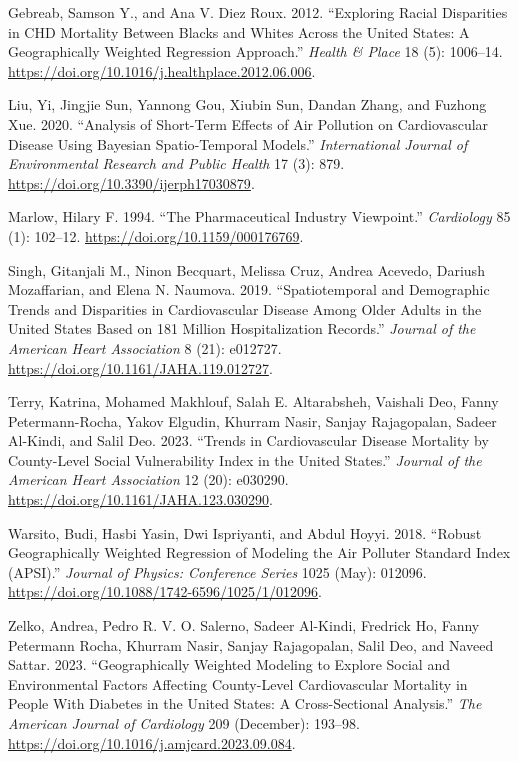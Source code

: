 \documentclass[
]{article}
\newlength{\cslhangindent}
\newenvironment{CSLReferences}[2] %
 {\begin{list}{}{%
  \setlength{\itemindent}{0pt}
  \setlength{\leftmargin}{0pt}
  \setlength{\parsep}{0pt}
  \ifodd #1
   \setlength{\leftmargin}{\cslhangindent}
   \setlength{\itemindent}{-1\cslhangindent}
  \fi
  \setlength{\itemsep}{#2\baselineskip}}}
 {\end{list}}
\begin{document}
\label{refs}
\begin{CSLReferences}{1}{0}
Gebreab, Samson Y., and Ana V. Diez Roux. 2012. {``Exploring Racial
Disparities in {CHD} Mortality Between Blacks and Whites Across the
{United} {States}: {A} Geographically Weighted Regression Approach.''}
\emph{Health \& Place} 18 (5): 1006--14.
\url{https://doi.org/10.1016/j.healthplace.2012.06.006}.

Liu, Yi, Jingjie Sun, Yannong Gou, Xiubin Sun, Dandan Zhang, and Fuzhong
Xue. 2020. {``Analysis of {Short}-{Term} {Effects} of {Air} {Pollution}
on {Cardiovascular} {Disease} {Using} {Bayesian} {Spatio}-{Temporal}
{Models}.''} \emph{International Journal of Environmental Research and
Public Health} 17 (3): 879.
\url{https://doi.org/10.3390/ijerph17030879}.

Marlow, Hilary F. 1994. {``The Pharmaceutical Industry Viewpoint.''}
\emph{Cardiology} 85 (1): 102--12.
\url{https://doi.org/10.1159/000176769}.

Singh, Gitanjali M., Ninon Becquart, Melissa Cruz, Andrea Acevedo,
Dariush Mozaffarian, and Elena N. Naumova. 2019. {``Spatiotemporal and
{Demographic} {Trends} and {Disparities} in {Cardiovascular} {Disease}
{Among} {Older} {Adults} in the {United} {States} {Based} on 181
{Million} {Hospitalization} {Records}.''} \emph{Journal of the American
Heart Association} 8 (21): e012727.
\url{https://doi.org/10.1161/JAHA.119.012727}.

Terry, Katrina, Mohamed Makhlouf, Salah E. Altarabsheh, Vaishali Deo,
Fanny Petermann-Rocha, Yakov Elgudin, Khurram Nasir, Sanjay Rajagopalan,
Sadeer Al-Kindi, and Salil Deo. 2023. {``Trends in {Cardiovascular}
{Disease} {Mortality} by {County}-{Level} {Social} {Vulnerability}
{Index} in the {United} {States}.''} \emph{Journal of the American Heart
Association} 12 (20): e030290.
\url{https://doi.org/10.1161/JAHA.123.030290}.

Warsito, Budi, Hasbi Yasin, Dwi Ispriyanti, and Abdul Hoyyi. 2018.
{``Robust Geographically Weighted Regression of Modeling the {Air}
{Polluter} {Standard} {Index} ({APSI}).''} \emph{Journal of Physics:
Conference Series} 1025 (May): 012096.
\url{https://doi.org/10.1088/1742-6596/1025/1/012096}.

Zelko, Andrea, Pedro R. V. O. Salerno, Sadeer Al-Kindi, Fredrick Ho,
Fanny Petermann Rocha, Khurram Nasir, Sanjay Rajagopalan, Salil Deo, and
Naveed Sattar. 2023. {``Geographically {Weighted} {Modeling} to
{Explore} {Social} and {Environmental} {Factors} {Affecting}
{County}-{Level} {Cardiovascular} {Mortality} in {People} {With}
{Diabetes} in the {United} {States}: {A} {Cross}-{Sectional}
{Analysis}.''} \emph{The American Journal of Cardiology} 209 (December):
193--98. \url{https://doi.org/10.1016/j.amjcard.2023.09.084}.

\end{CSLReferences}
\end{document}
